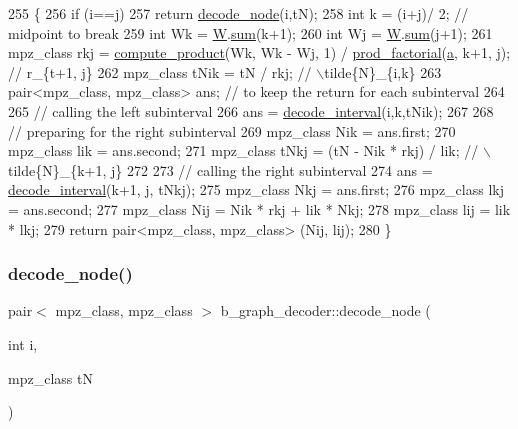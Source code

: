 \begin{DoxyCode}
255 \{
256   \textcolor{keywordflow}{if} (i==j)
257     \textcolor{keywordflow}{return} \hyperlink{classb__graph__decoder_a3d6d38da4436a92ebd01693cd3eb7c16}{decode\_node}(i,tN);
258   \textcolor{keywordtype}{int} k = (i+j)/ 2; \textcolor{comment}{// midpoint to break}
259   \textcolor{keywordtype}{int} Wk = \hyperlink{classb__graph__decoder_a2c3f91db1f54ddfd411f74d18b01b606}{W}.\hyperlink{classreverse__fenwick__tree_a672731fd6395b4853430073a099a80e6}{sum}(k+1);
260   \textcolor{keywordtype}{int} Wj = \hyperlink{classb__graph__decoder_a2c3f91db1f54ddfd411f74d18b01b606}{W}.\hyperlink{classreverse__fenwick__tree_a672731fd6395b4853430073a099a80e6}{sum}(j+1);
261   mpz\_class rkj = \hyperlink{compression__helper_8cpp_ae2afb43aabe50f7d42aae8f82b5a35f4}{compute\_product}(Wk, Wk - Wj, 1) / 
      \hyperlink{compression__helper_8cpp_a86d8a20e022dc06b23df3b08ac10b7d1}{prod\_factorial}(\hyperlink{classb__graph__decoder_afcf783e4199fb8f9d6828db08bb12333}{a}, k+1, j); \textcolor{comment}{// r\_\{t+1, j\}}
262   mpz\_class tNik = tN / rkj; \textcolor{comment}{// \(\backslash\)tilde\{N\}\_\{i,k\}}
263   pair<mpz\_class, mpz\_class> ans; \textcolor{comment}{// to keep the return for each subinterval}
264 
265   \textcolor{comment}{// calling the left subinterval }
266   ans = \hyperlink{classb__graph__decoder_ae8b20698e015819cbdb8da7997888fd8}{decode\_interval}(i,k,tNik);
267 
268   \textcolor{comment}{// preparing for the right subinterval}
269   mpz\_class Nik = ans.first;
270   mpz\_class lik = ans.second;
271   mpz\_class tNkj = (tN - Nik * rkj) / lik; \textcolor{comment}{// \(\backslash\)tilde\{N\}\_\{k+1, j\}}
272 
273   \textcolor{comment}{// calling the right subinterval}
274   ans = \hyperlink{classb__graph__decoder_ae8b20698e015819cbdb8da7997888fd8}{decode\_interval}(k+1, j, tNkj);
275   mpz\_class Nkj = ans.first;
276   mpz\_class lkj = ans.second;
277   mpz\_class Nij = Nik * rkj + lik * Nkj;
278   mpz\_class lij = lik * lkj;
279   \textcolor{keywordflow}{return} pair<mpz\_class, mpz\_class> (Nij, lij);
280 \}
\end{DoxyCode}
\mbox{\label{classb__graph__decoder_a3d6d38da4436a92ebd01693cd3eb7c16}} 
\subsubsection{\texorpdfstring{decode\+\_\+node()}{decode\_node()}}
{\footnotesize\ttfamily pair$<$ mpz\+\_\+class, mpz\+\_\+class $>$ b\+\_\+graph\+\_\+decoder\+::decode\+\_\+node (\begin{DoxyParamCaption}\item[{int}]{i,  }\item[{mpz\+\_\+class}]{tN }\end{DoxyParamCaption})}



